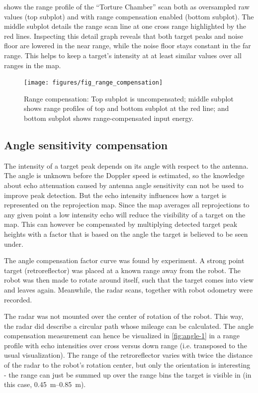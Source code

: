  shows the range profile of the ``Torture Chamber'' scan
both as oversampled raw values (top subplot) and with range compensation
enabled (bottom subplot). The middle subplot details the range scan line
at one cross range highlighted by the red lines. Inspecting this detail
graph reveals that both target peaks and noise floor are lowered in the
near range, while the noise floor stays constant in the far range. This
helps to keep a target's intensity at at least similar values over all
ranges in the map.

\begin{figure}[htbp]
    \centering
    \texttt{[image: figures/fig\_range\_compensation]}
    \caption{Range compensation: Top subplot is uncompensated; middle subplot shows range profiles of top and bottom subplot at the red line; and bottom subplot shows range-compensated input energy.}
    \label{fig:fig_range_compensation}
\end{figure}


\subsection{Angle sensitivity compensation} \label{angle-sensitivity-compensation}

The intensity of a target peak depends on its angle with respect to the
antenna. The angle is unknown before the Doppler speed is estimated, so
the knowledge about echo attenuation caused by antenna angle sensitivity
can not be used to improve peak detection. But the echo intensity
influences how a target is represented on the reprojection map. Since
the map averages all reprojections to any given point a low intensity
echo will reduce the visibility of a target on the map. This can however
be compensated by multiplying detected target peak heights with a factor
that is based on the angle the target is believed to be seen under.

The angle compensation factor curve was found by experiment. A strong
point target (retroreflector) was placed at a known range away from
the robot. The robot was then made to rotate around itself, such that
the target comes into view and leaves again. Meanwhile, the radar scans,
together with robot odometry were recorded.

The radar was not mounted over the center of rotation of the robot. This
way, the radar did describe a circular path whose mileage can be
calculated. The angle compensation measurement can hence be visualized
in \cref{fig:angle-1} in a range profile with echo intensities over
cross versus down range (i.e. transposed to the usual visualization). The range of the retroreflector varies with
twice the distance of the radar to the robot's rotation center, but only
the orientation is interesting - the range can just be summed up over
the range bins the target is visible in (in this case,
\SIrange{0.45}{0.85}{m}).

